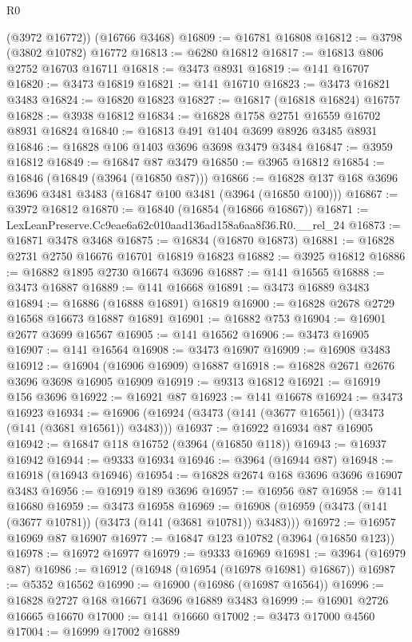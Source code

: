 \begin{lexlean}{R0}
\begin{coremodule}
      (@3972 @16772))
    (@16766 @3468)
@16809 := @16781 @16808
@16812 := @3798 (@3802 @10782) @16772
@16813 := @6280 @16812
@16817 := @16813 @806 @2752 @16703 @16711
@16818 := @3473 @8931
@16819 := @141 @16707
@16820 := @3473 @16819
@16821 := @141 @16710
@16823 := @3473 @16821 @3483
@16824 := @16820 @16823
@16827 := @16817 (@16818 @16824) @16757
@16828 := @3938 @16812
@16834 := @16828 @1758 @2751 @16559 @16702 @8931 @16824
@16840 := @16813 @491 @1404 @3699 @8926 @3485 @8931
@16846 := @16828 @106 @1403 @3696 @3698 @3479 @3484
@16847 := @3959 @16812
@16849 := @16847 @87 @3479
@16850 := @3965 @16812
@16854 := @16846 (@16849 (@3964 (@16850 @87)))
@16866 := @16828 @137 @168 @3696 @3696 @3481 @3483 (@16847 @100 @3481 (@3964 (@16850 @100)))
@16867 := @3972 @16812
@16870 := @16840 (@16854 (@16866 @16867))
@16871 := LexLeanPreserve.Cc9eae6a62c010aad136ad158a6aa8f36.R0.__rel_24
@16873 := @16871 @3478 @3468
@16875 := @16834 (@16870 @16873)
@16881 := @16828 @2731 @2750 @16676 @16701 @16819 @16823
@16882 := @3925 @16812
@16886 := @16882 @1895 @2730 @16674 @3696
@16887 := @141 @16565
@16888 := @3473 @16887
@16889 := @141 @16668
@16891 := @3473 @16889 @3483
@16894 := @16886 (@16888 @16891) @16819
@16900 := @16828 @2678 @2729 @16568 @16673 @16887 @16891
@16901 := @16882 @753
@16904 := @16901 @2677 @3699 @16567
@16905 := @141 @16562
@16906 := @3473 @16905
@16907 := @141 @16564
@16908 := @3473 @16907
@16909 := @16908 @3483
@16912 := @16904 (@16906 @16909) @16887
@16918 := @16828 @2671 @2676 @3696 @3698 @16905 @16909
@16919 := @9313 @16812
@16921 := @16919 @156 @3696
@16922 := @16921 @87
@16923 := @141 @16678
@16924 := @3473 @16923
@16934 := @16906 (@16924 (@3473 (@141 (@3677 @16561)) (@3473 (@141 (@3681 @16561)) @3483)))
@16937 := @16922 @16934 @87 @16905
@16942 := @16847 @118 @16752 (@3964 (@16850 @118))
@16943 := @16937 @16942
@16944 := @9333 @16934
@16946 := @3964 (@16944 @87)
@16948 := @16918 (@16943 @16946)
@16954 := @16828 @2674 @168 @3696 @3696 @16907 @3483
@16956 := @16919 @189 @3696
@16957 := @16956 @87
@16958 := @141 @16680
@16959 := @3473 @16958
@16969 := @16908 (@16959 (@3473 (@141 (@3677 @10781)) (@3473 (@141 (@3681 @10781)) @3483)))
@16972 := @16957 @16969 @87 @16907
@16977 := @16847 @123 @10782 (@3964 (@16850 @123))
@16978 := @16972 @16977
@16979 := @9333 @16969
@16981 := @3964 (@16979 @87)
@16986 := @16912 (@16948 (@16954 (@16978 @16981) @16867))
@16987 := @5352 @16562
@16990 := @16900 (@16986 (@16987 @16564))
@16996 := @16828 @2727 @168 @16671 @3696 @16889 @3483
@16999 := @16901 @2726 @16665 @16670
@17000 := @141 @16660
@17002 := @3473 @17000 @4560
@17004 := @16999 @17002 @16889

\end{coremodule}
\end{lexlean}
